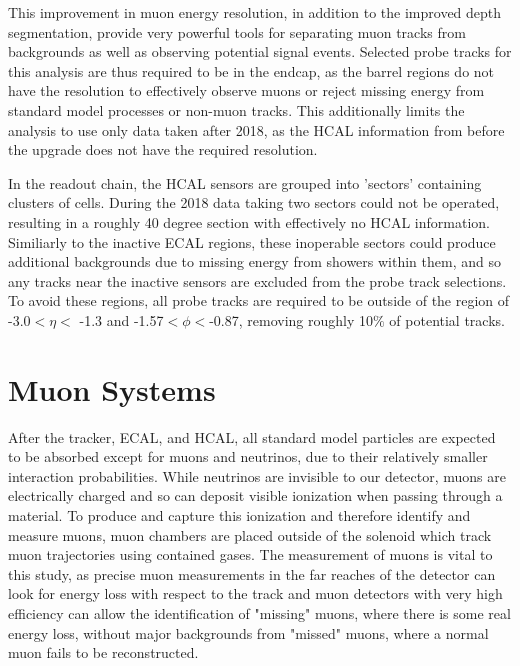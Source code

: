 This improvement in muon energy resolution, in addition to the improved depth segmentation, provide very powerful tools for separating muon tracks from backgrounds as well as observing potential signal events.
Selected probe tracks for this analysis are thus required to be in the endcap, as the barrel regions do not have the resolution to effectively observe muons or reject missing energy from standard model processes or non-muon tracks.
This additionally limits the analysis to use only data taken after 2018, as the HCAL information from before the upgrade does not have the required resolution.

In the readout chain, the HCAL sensors are grouped into 'sectors' containing clusters of cells. During the 2018 data taking two sectors could not be operated, resulting in a roughly 40 degree section with effectively no HCAL information. Similiarly to the inactive ECAL regions, these inoperable sectors could produce additional backgrounds due to missing energy from showers within them, and so any tracks near the inactive sensors are excluded from the probe track selections. 
To avoid these regions, all probe tracks are required to be outside of the region of -3.0$<\eta<$ -1.3 and -1.57$<\phi<$-0.87, removing roughly 10$\%$ of potential tracks.

\section{Muon Systems}
After the tracker, ECAL, and HCAL, all standard model particles are expected to be absorbed except for muons and neutrinos, due to their relatively smaller interaction probabilities.
While neutrinos are invisible to our detector, muons are electrically charged and so can deposit visible ionization when passing through a material.
To produce and capture this ionization and therefore identify and measure muons, muon chambers are placed outside of the solenoid which track muon trajectories using contained gases.
The measurement of muons is vital to this study, as precise muon measurements in the far reaches of the detector can look for energy loss with respect to the track and muon detectors with very high efficiency can allow the identification of "missing" muons, where there is some real energy loss, without major backgrounds from "missed" muons, where a normal muon fails to be reconstructed.

